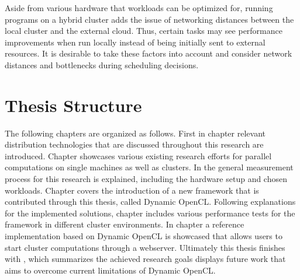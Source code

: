 \begin{description}[style=nextline]
    \item [Optimized Scheduling]
    Aside from various hardware that workloads can be optimized for, running programs on a hybrid cluster adds the issue of networking distances between the local cluster and the external cloud. Thus, certain tasks may see performance improvements when run locally instead of being initially sent to external resources. It is desirable to take these factors into account and consider network distances and bottlenecks during scheduling decisions.

\end{description}


\section*{Thesis Structure}
\label{structure}

The following chapters are organized as follows. First in chapter \textit{} relevant distribution technologies that are discussed throughout this research are introduced. Chapter \textit{} showcases various existing research efforts for parallel computations on single machines as well as clusters. In \textit{} the general measurement process for this research is explained, including the hardware setup and chosen workloads. Chapter \textit{} covers the introduction of a new framework that is contributed through this thesis, called Dynamic OpenCL. Following explanations for the implemented solutions, chapter \textit{} includes various performance tests for the framework in different cluster environments. In chapter \textit{} a reference implementation based on Dynamic OpenCL is showcased that allows users to start cluster computations through a webserver. Ultimately this thesis finishes with \textit{}, which summarizes the achieved research goals displays future work that aims to overcome current limitations of Dynamic OpenCL.